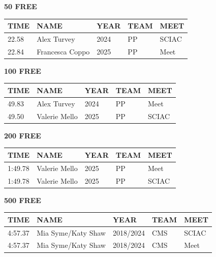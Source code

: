 \begin{table}[H]
\centering
\begin{minipage}[t]{0.48\textwidth}
\centering
\textbf{50 FREE}\\[0.1cm]
\begin{tabular}{@{}p{1.8cm}p{2.8cm}p{1.2cm}p{1.4cm}p{1.4cm}@{}}
\hline
    \textbf{TIME} & \textbf{NAME} & \textbf{YEAR} & \textbf{TEAM} & \textbf{MEET} \\
\hline
    22.58 & Alex Turvey & 2024 & PP & SCIAC \\
    22.84 & Francesca Coppo & 2025 & PP & Meet \\
\hline
\end{tabular}
\end{minipage}\hfill
\begin{minipage}[t]{0.48\textwidth}
\centering
\textbf{100 FREE}\\[0.1cm]
\begin{tabular}{@{}p{1.8cm}p{2.8cm}p{1.2cm}p{1.4cm}p{1.4cm}@{}}
\hline
    \textbf{TIME} & \textbf{NAME} & \textbf{YEAR} & \textbf{TEAM} & \textbf{MEET} \\
\hline
    49.83 & Alex Turvey & 2024 & PP & Meet \\
    49.50 & Valerie Mello & 2025 & PP & SCIAC \\
\hline
\end{tabular}
\end{minipage}
\end{table}

\begin{table}[H]
\centering
\begin{minipage}[t]{0.48\textwidth}
\centering
\textbf{200 FREE}\\[0.1cm]
\begin{tabular}{@{}p{1.8cm}p{2.8cm}p{1.2cm}p{1.4cm}p{1.4cm}@{}}
\hline
    \textbf{TIME} & \textbf{NAME} & \textbf{YEAR} & \textbf{TEAM} & \textbf{MEET} \\
\hline
    1:49.78 & Valerie Mello & 2025 & PP & Meet \\
    1:49.78 & Valerie Mello & 2025 & PP & SCIAC \\
\hline
\end{tabular}
\end{minipage}\hfill
\begin{minipage}[t]{0.48\textwidth}
\centering
\textbf{500 FREE}\\[0.1cm]
\begin{tabular}{@{}p{1.8cm}p{2.8cm}p{1.2cm}p{1.4cm}p{1.4cm}@{}}
\hline
    \textbf{TIME} & \textbf{NAME} & \textbf{YEAR} & \textbf{TEAM} & \textbf{MEET} \\
\hline
    4:57.37 & Mia Syme/Katy Shaw & 2018/2024 & CMS & SCIAC \\
    4:57.37 & Mia Syme/Katy Shaw & 2018/2024 & CMS & Meet \\
\hline
\end{tabular}
\end{minipage}
\end{table}

